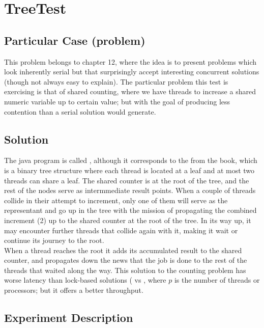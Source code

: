 \newpage
\section{\textbf{TreeTest}}

\subsection{Particular Case (problem)}
This problem belongs to chapter 12, where the idea is to present
problems which look inherently serial but that surprisingly accept
interesting concurrent solutions (though not always easy to
explain). The particular problem this test is exercising is that of
shared 
counting, where we have  threads to increase a shared numeric
variable up to certain value; but with the goal of producing less
contention than a serial solution would generate. 

\subsection{Solution}

The java program is called , although it corresponds to  
the  from the book, which is a binary tree structure
where each thread is located at a leaf and at most two threads can
share a leaf. The shared counter is at the root of the tree, and the
rest of the nodes serve as intermmediate result points. When a couple
of threads collide in their attempt to increment, only one of them
will serve as the representant and go up in the tree with the mission
of propagating the combined increment (2) up to the shared counter at
the root of the tree. In its way up, it may encounter further threads
that collide again with it, making it wait or continue its journey to
the root. \\

When a thread reaches the root it adds its accumulated result to the
shared counter, and propagates down the news that the job is done to
the rest of the threads that waited along the way. This
solution to the counting problem has worse latency than lock-based
solutions ( vs , where $p$ is the number of
threads or processors; but it offers a better throughput. 

\subsection{Experiment Description}

